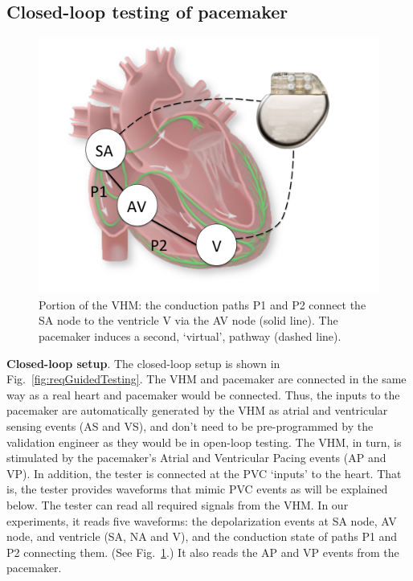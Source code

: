 \subsection{Closed-loop testing of pacemaker}
\label{closedloop}

\begin{figure}[t]
\centering
\includegraphics[scale=0.2]{figures/nodesandPM}
\caption{Portion of the VHM: the conduction paths P1 and P2 connect the SA node to the ventricle V via the AV node (solid line). The pacemaker induces a second, `virtual', pathway (dashed line).}
\label{fig:nodesandPM}
\vspace{-.5cm}
\end{figure}

\textbf{Closed-loop setup}.
The closed-loop setup is shown in Fig.~\ref{fig:reqGuidedTesting}.
The VHM and pacemaker are connected in the same way as a real heart and pacemaker would be connected.
Thus, the inputs to the pacemaker are automatically generated by the VHM as atrial and ventricular sensing events (AS and VS), and don't need to be pre-programmed by the validation engineer as they would be in open-loop testing. 
The VHM, in turn, is stimulated by the pacemaker's Atrial and Ventricular Pacing events (AP and VP).
In addition, the tester is connected at the PVC `inputs' to the heart.
That is, the tester provides waveforms that mimic  PVC events as will be explained below.
The tester can read all required signals from the VHM.
In our experiments, it reads five waveforms: the depolarization events at SA node, AV node, and ventricle (SA, NA and V), and the conduction state of paths P1 and P2 connecting them. (See Fig.~\ref{fig:nodesandPM}.)
It also reads the AP and VP events from the pacemaker.

